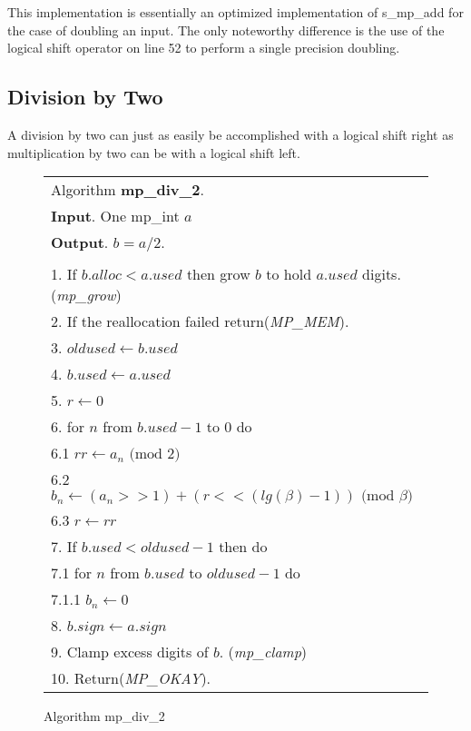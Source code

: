 \documentclass[b5paper]{book}
\begin{document}
This implementation is essentially an optimized implementation of s\_mp\_add for the case of doubling an input.  The only noteworthy difference
is the use of the logical shift operator on line 52 to perform a single precision doubling.  

\subsection{Division by Two}
A division by two can just as easily be accomplished with a logical shift right as multiplication by two can be with a logical shift left.

\newpage\begin{figure}[!here]
\begin{small}
\begin{center}
\begin{tabular}{l}
\hline Algorithm \textbf{mp\_div\_2}. \\
\textbf{Input}.   One mp\_int $a$ \\
\textbf{Output}.  $b = a/2$. \\
\hline \\
1.  If $b.alloc < a.used$ then grow $b$ to hold $a.used$ digits.  (\textit{mp\_grow}) \\
2.  If the reallocation failed return(\textit{MP\_MEM}). \\
3.  $oldused \leftarrow b.used$ \\
4.  $b.used \leftarrow a.used$ \\
5.  $r \leftarrow 0$ \\
6.  for $n$ from $b.used - 1$ to $0$ do \\
\hspace{3mm}6.1  $rr \leftarrow a_n \mbox{ (mod }2\mbox{)}$\\
\hspace{3mm}6.2  $b_n \leftarrow (a_n >> 1) + (r << (lg(\beta) - 1)) \mbox{ (mod }\beta\mbox{)}$ \\
\hspace{3mm}6.3  $r \leftarrow rr$ \\
7.  If $b.used < oldused - 1$ then do \\
\hspace{3mm}7.1  for $n$ from $b.used$ to $oldused - 1$ do \\
\hspace{6mm}7.1.1  $b_n \leftarrow 0$ \\
8.  $b.sign \leftarrow a.sign$ \\
9.  Clamp excess digits of $b$.  (\textit{mp\_clamp}) \\
10.  Return(\textit{MP\_OKAY}).\\
\hline
\end{tabular}
\end{center}
\end{small}
\caption{Algorithm mp\_div\_2}
\end{figure}
\end{document}
